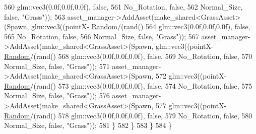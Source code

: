 \begin{DoxyCode}
560                                                             glm::vec3(0.0f,0.0f,0.0f), \textcolor{keyword}{false},
561                                                             No\_Rotation, \textcolor{keyword}{false},
562                                                             Normal\_Size, \textcolor{keyword}{false}, \textcolor{stringliteral}{"Grass"}));            
563             asset\_manager->AddAsset(make\_shared<GrassAsset>(Spawn, glm::vec3((pointX-
      \hyperlink{class_game_world_a56652cc9880b3ba1be61395066c863c3}{Random}/(rand() %
564                                                             glm::vec3(0.0f,0.0f,0.0f), \textcolor{keyword}{false},
565                                                             No\_Rotation, \textcolor{keyword}{false},
566                                                             Normal\_Size, \textcolor{keyword}{false}, \textcolor{stringliteral}{"Grass"}));
567             asset\_manager->AddAsset(make\_shared<GrassAsset>(Spawn, glm::vec3((pointX-
      \hyperlink{class_game_world_a56652cc9880b3ba1be61395066c863c3}{Random}/(rand() %
568                                                             glm::vec3(0.0f,0.0f,0.0f), \textcolor{keyword}{false},
569                                                             No\_Rotation, \textcolor{keyword}{false},
570                                                             Normal\_Size, \textcolor{keyword}{false}, \textcolor{stringliteral}{"Grass"}));
571             asset\_manager->AddAsset(make\_shared<GrassAsset>(Spawn,
572                                                             glm::vec3((pointX-
      \hyperlink{class_game_world_a56652cc9880b3ba1be61395066c863c3}{Random}/(rand() %
573                                                             glm::vec3(0.0f,0.0f,0.0f), \textcolor{keyword}{false},
574                                                             No\_Rotation, \textcolor{keyword}{false},
575                                                             Normal\_Size, \textcolor{keyword}{false}, \textcolor{stringliteral}{"Grass"}));
576             asset\_manager->AddAsset(make\_shared<GrassAsset>(Spawn,
577                                                             glm::vec3((pointX-
      \hyperlink{class_game_world_a56652cc9880b3ba1be61395066c863c3}{Random}/(rand() %
578                                                             glm::vec3(0.0f,0.0f,0.0f), \textcolor{keyword}{false},
579                                                             No\_Rotation, \textcolor{keyword}{false},
580                                                             Normal\_Size, \textcolor{keyword}{false}, \textcolor{stringliteral}{"Grass"}));
581    \}
582   \}
583  \}
584 \}
\end{DoxyCode}


